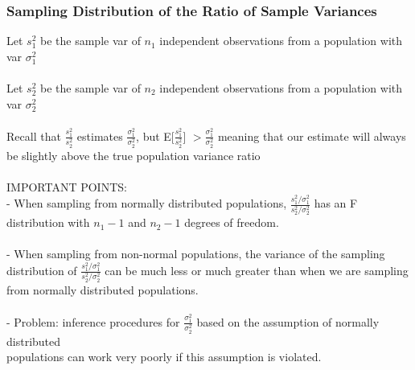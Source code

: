 \documentclass[12pt, a4paper]{article}
\begin{document}
	\subsubsection{Sampling Distribution of the Ratio of Sample Variances}
	Let $s^2_1$ be the sample var of $n_1$ independent observations from a population with var $\sigma^2_1$ \\~\\
	Let $s^2_2$ be the sample var of $n_2$ independent observations from a population with var $\sigma^2_2$ \\~\\
	Recall that $\frac{s^2_1}{s^2_2}$ estimates $\frac{\sigma^2_1}{\sigma^2_2}$, but E[$\frac{s^2_1}{s^2_2}$] $> \frac{\sigma^2_1}{\sigma^2_2}$ meaning that our estimate will always be slightly above the true population variance ratio \\~\\
	IMPORTANT POINTS: \\
	- When sampling from normally distributed populations, $\frac{s^2_1/\sigma^2_1}{s^2_2/\sigma^2_2}$ has an F distribution with $n_1-1$ \hspace*{2mm} and $n_2-1$ degrees of freedom. \\~\\
	- When sampling from non-normal populations, the variance of the sampling distribution of \hspace*{2mm} $\frac{s^2_1/\sigma^2_1}{s^2_2/\sigma^2_2}$ can be much less or much greater than when we are sampling from normally distributed \hspace*{2mm} populations. \\~\\
	- Problem: inference procedures for $\frac{\sigma^2_1}{\sigma^2_2}$ based on the assumption of normally distributed \\ \hspace*{2mm} populations can work very poorly if this assumption is violated. \newpage
	
\end{document}
